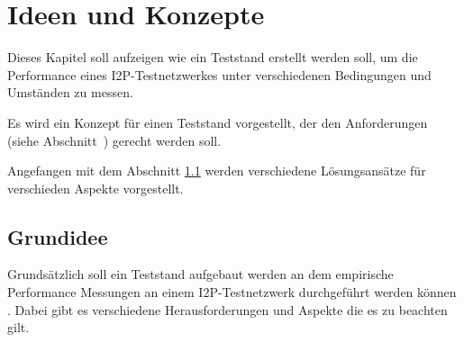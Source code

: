 \chapter{Ideen und Konzepte}
\label{ch:ideen_und_konzepte}

Dieses Kapitel soll aufzeigen wie ein Teststand erstellt werden soll, um die Performance eines I2P-Testnetzwerkes unter verschiedenen Bedingungen und Umständen zu messen.

Es wird ein Konzept für einen Teststand vorgestellt, der den Anforderungen (siehe Abschnitt~) gerecht werden soll.

Angefangen mit dem Abschnitt \ref{sec:grundidee} werden verschiedene Lösungsansätze für verschieden Aspekte vorgestellt.



\section{Grundidee}\label{sec:grundidee}



Grundsätzlich soll ein Teststand aufgebaut werden an dem empirische Performance Messungen an einem I2P-Testnetzwerk durchgeführt werden können .
Dabei gibt es verschiedene Herausforderungen und Aspekte die es zu beachten gilt.

